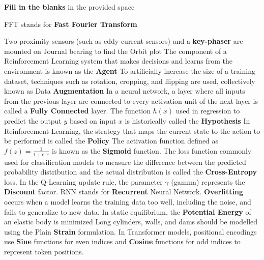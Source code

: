 \documentclass[12pt]{exam}
\begin{document}
        \begin{center}

            \textbf{Fill in the blanks} in the provided space
        \end{center}
        \begin{questions}
        
		
		
           \question FFT stands for \textbf{Fast Fourier Transform}
    
           \question Two proximity sensors (such as eddy-current sensors) and a \textbf{key-phaser} are mounted on Journal bearing to find the Orbit plot
            \question The component of a Reinforcement Learning system that makes decisions and learns from the environment is known as the \textbf{Agent}
            \question To artificially increase the size of a training dataset, techniques such as rotation, cropping, and flipping are used, collectively known as Data \textbf{Augmentation}
            \question In a neural network, a layer where all inputs from the previous layer are connected to every activation unit of the next layer is called a \textbf{Fully Connected} layer. 
            \question The function $h(x)$ used in regression to predict the output $y$ based on input $x$ is historically called the \textbf{Hypothesis} %
            \question In Reinforcement Learning, the strategy that maps the current state to the action to be performed is called the \textbf{Policy} %
            \question The activation function defined as $f(z) = \frac{1}{1+e^{-z}}$ is known as the \textbf{Sigmoid} function. %
            \question The loss function commonly used for classification models to measure the difference between the predicted probability distribution and the actual distribution is called the \textbf{Cross-Entropy} loss. %
            \question In the Q-Learning update rule, the parameter $\gamma$ (gamma) represents the \textbf{Discount} factor. %
            \question RNN stands for \textbf{Recurrent} Neural Network. %
            \question \textbf{Overfitting} occurs when a model learns the training data too well, including the noise, and fails to generalize to new data. %
            \question In static equilibrium, the \textbf{Potential Energy} of an elastic body is minimized
            \question Long cylinders, walls, and dams should be modelled using the Plain \textbf{Strain} formulation.
            \question In Transformer models, positional encodings use \textbf{Sine} functions for even indices and \textbf{Cosine} functions for odd indices to represent token positions. %

        \end{questions}
        \setcounter{question}{0}
\end{document}
